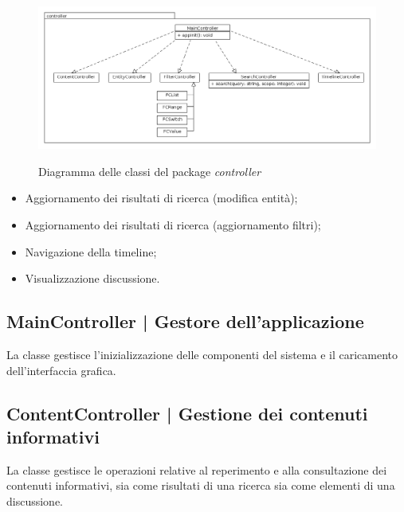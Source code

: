 \documentclass[10pt,a4paper,headinclude,footinclude,hidelinks]{scrreprt} %
\begin{document}
	\begin{figure}[ht]
		\begin{center}
	    	\includegraphics[width=12cm]{class/controller.png}
			\label{gfx:class:controller}
			\caption{Diagramma delle classi del package \textit{controller}}
		\end{center}
	\end{figure}

	\begin{itemize}
	\item Aggiornamento dei risultati di ricerca (modifica entità);
	\item Aggiornamento dei risultati di ricerca (aggiornamento filtri);
	\item Navigazione della timeline;
	\item Visualizzazione discussione.
	\end{itemize}

	\subsection[MainController]{MainController | Gestore dell'applicazione}
	\label{sec:stage:design:controller:main-controller}
	La classe \textit{} gestisce l'inizializzazione delle componenti del sistema e il caricamento dell'interfaccia grafica.

	\subsection[ContentController]{ContentController | Gestione dei contenuti informativi}
	\label{sec:stage:design:controller:content}
	La classe \textit{} gestisce le operazioni relative al reperimento e alla consultazione dei contenuti informativi, sia come risultati di una ricerca sia come elementi di una discussione.
\end{document}
